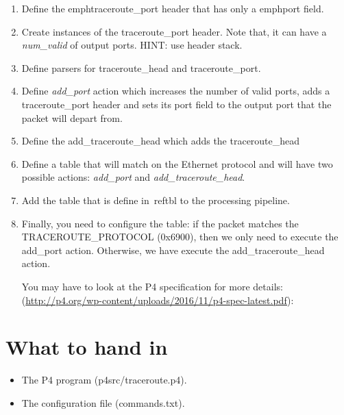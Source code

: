 \documentclass{article}
\begin{document}
\begin{enumerate}

\item Define the emph{traceroute_port} header that has only a emph{port} field.

\item Create instances of the traceroute\_port header. Note that, it can have a
\emph{num\_valid} of output ports. HINT: use header stack.

\item Define parsers for traceroute_head and traceroute_port.

\item Define \emph{add\_port} action which increases the number of valid ports,
adds a traceroute\_port header and sets its port field to the output port that
the packet will depart from.

\item Define the add_traceroute_head which adds the traceroute_head

\item Define a table\label{tbl} that will match on the Ethernet protocol and
will have two possible actions: \emph{add\_port} and
\emph{add\_traceroute\_head}.

\item Add the table that is define in~ref{tbl} to the processing pipeline.

\item Finally, you need to configure the table: if the packet matches the
TRACEROUTE\_PROTOCOL (0x6900), then we only need to execute the add\_port
action. Otherwise, we have execute the add\_traceroute\_head action.

You may have to look at the P4 specification for more details:
 (\url{http://p4.org/wp-content/uploads/2016/11/p4-spec-latest.pdf}):

\end{enumerate}

\section*{What to hand in}
\begin{itemize}
\item The P4 program (p4src/traceroute.p4).
\item The configuration file (commands.txt).
\end{itemize}
\end{document}
